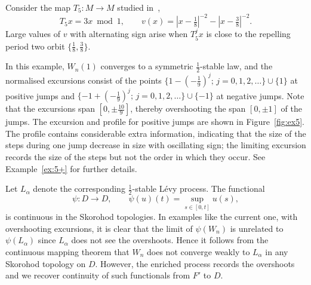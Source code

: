 \documentclass[12pt]{article}
\numberwithin{equation}{section}
\begin{document}
\begin{example} \label{ex:5}
Consider the map $T_5:M\to M$ studied in~\cite[Example~2.7]{Freitas2Toddsub}, 
\[
T_5x=3x\bmod1, \qquad v(x)=|x-\tfrac18|^{-2}-|x-\tfrac38|^{-2}.
\]
Large values of $v$ with alternating sign arise when $T_5^jx$ is close to the repelling period two orbit $\{\frac18,\frac38\}$.

In this example, $W_n(1)$ converges to a symmetric $\frac12$-stable law, and the normalised excursions consist of the points
$\{1-(-\frac19)^j;\,j=0,1,2,\ldots\}\cup\{1\}$ at positive jumps and
$\{-1+(-\frac19)^j;\,j=0,1,2,\ldots\}\cup\{-1\}$ at negative jumps.
Note that the excursions span $[0,\pm\frac{10}{9}]$, thereby overshooting the span $[0,\pm1]$ of the jumps. 
The excursion and profile for positive jumps are shown in Figure~\ref{fig:ex5}.
The profile contains considerable extra information, indicating that the size of the steps during one jump decrease in size with oscillating sign; the limiting excursion records the size of the steps but not the order in which they occur.
See Example~\ref{ex:5+} for further details.

Let $L_\alpha$ denote the corresponding $\frac12$-stable L\'evy process.
The functional 
\[
\psi:D\to D, \qquad
\psi(u)(t)=\sup_{s\in[0,t]}u(s),
\]
 is continuous in the Skorohod topologies.
In examples like the current one, with overshooting excursions, it is clear that the limit of $\psi(W_n)$ is unrelated to $\psi(L_\alpha)$ since $L_\alpha$ does not see the overshoots. Hence it follows from 
 the continuous mapping theorem that $W_n$ does not converge weakly to $L_\alpha$ in any Skorohod topology on $D$.
However, the enriched process records the overshoots and we recover
continuity of such functionals from $F'$ to $D$.
\end{example}
\end{document}
